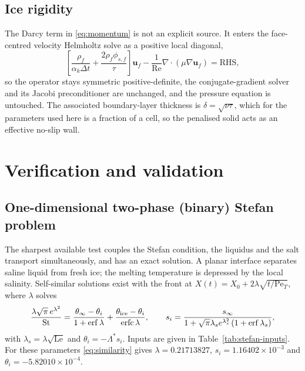 \documentclass[review,12pt]{elsarticle}
\newcommand{\uvec}{\mathbf{u}}
\newcommand{\Pet}{\mathrm{Pe}_T}
\newcommand{\St}{\mathrm{St}}
\begin{document}
\subsection{Ice rigidity}
\label{sec:brinkman}

The Darcy term in \eqref{eq:momentum} is not an explicit source. It enters the
face-centred velocity Helmholtz solve as a positive local diagonal,
\begin{equation}
  \left[\frac{\rho_f}{\alpha_k \Delta t}
        + \frac{2\rho_f \phi_{s,f}}{\tau}\right]\uvec_f
  - \frac{1}{\mathrm{Re}}\nabla\cdot(\mu\nabla \uvec_f)
  = \mathrm{RHS} ,
  \label{eq:brinkman}
\end{equation}
so the operator stays symmetric positive-definite, the conjugate-gradient solver
and its Jacobi preconditioner are unchanged, and the pressure equation is
untouched. The associated boundary-layer thickness is
$\delta = \sqrt{\nu\tau}$, which for the parameters used here is a fraction of a
cell, so the penalised solid acts as an effective no-slip wall.

\section{Verification and validation}
\label{sec:validation}

\subsection{One-dimensional two-phase (binary) Stefan problem}
\label{sec:stefan}

The sharpest available test couples the Stefan condition, the liquidus and the
salt transport simultaneously, and has an exact solution. A planar interface
separates saline liquid from fresh ice; the melting temperature is depressed by
the local salinity. Self-similar solutions exist with the front at
$X(t) = X_0 + 2\lambda\sqrt{t/\Pet}$, where $\lambda$ solves
\begin{equation}
  \frac{\lambda\sqrt{\pi}\,e^{\lambda^2}}{\St}
  = \frac{\theta_\infty-\theta_i}{1+\mathrm{erf}\,\lambda}
  + \frac{\theta_{\rm ice}-\theta_i}{\mathrm{erfc}\,\lambda},
  \qquad
  s_i = \frac{s_\infty}
  {1+\sqrt{\pi}\lambda_s e^{\lambda_s^2}\left(1+\mathrm{erf}\,\lambda_s\right)},
  \label{eq:similarity}
\end{equation}
with $\lambda_s = \lambda\sqrt{\mathrm{Le}}$ and $\theta_i = -\Lambda^{*}s_i$.
Inputs are given in Table~\ref{tab:stefan-inputs}. For these parameters
\eqref{eq:similarity} gives $\lambda = 0.21713827$,
$s_i = 1.16402\times10^{-3}$ and $\theta_i = -5.82010\times10^{-4}$.
\end{document}
